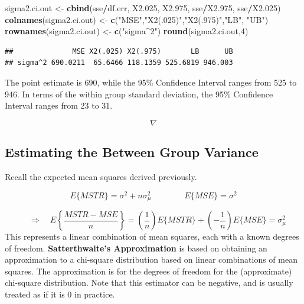 \documentclass[
]{book}
\newenvironment{Shaded}{\begin{snugshade}}{\end{snugshade}}
\newcommand{\DecValTok}[1]{\textcolor[rgb]{0.00,0.00,0.81}{#1}}
\newcommand{\FloatTok}[1]{\textcolor[rgb]{0.00,0.00,0.81}{#1}}
\newcommand{\FunctionTok}[1]{\textcolor[rgb]{0.13,0.29,0.53}{\textbf{#1}}}
\newcommand{\NormalTok}[1]{#1}
\newcommand{\OtherTok}[1]{\textcolor[rgb]{0.56,0.35,0.01}{#1}}
\newcommand{\SpecialCharTok}[1]{\textcolor[rgb]{0.81,0.36,0.00}{\textbf{#1}}}
\newcommand{\StringTok}[1]{\textcolor[rgb]{0.31,0.60,0.02}{#1}}
\begin{document}
\begin{Shaded}
\begin{Highlighting}[]
\NormalTok{sigma2.ci.out }\OtherTok{\textless{}{-}} \FunctionTok{cbind}\NormalTok{(sse}\SpecialCharTok{/}\NormalTok{df.err, X2}\FloatTok{.025}\NormalTok{, X2}\FloatTok{.975}\NormalTok{,  sse}\SpecialCharTok{/}\NormalTok{X2}\FloatTok{.975}\NormalTok{, sse}\SpecialCharTok{/}\NormalTok{X2}\FloatTok{.025}\NormalTok{)}
\FunctionTok{colnames}\NormalTok{(sigma2.ci.out) }\OtherTok{\textless{}{-}} \FunctionTok{c}\NormalTok{(}\StringTok{"MSE"}\NormalTok{,}\StringTok{"X2(.025)"}\NormalTok{,}\StringTok{"X2(.975)"}\NormalTok{,}\StringTok{"LB"}\NormalTok{, }\StringTok{"UB"}\NormalTok{)}
\FunctionTok{rownames}\NormalTok{(sigma2.ci.out) }\OtherTok{\textless{}{-}} \FunctionTok{c}\NormalTok{(}\StringTok{"sigma\^{}2"}\NormalTok{)}
\FunctionTok{round}\NormalTok{(sigma2.ci.out,}\DecValTok{4}\NormalTok{)}
\end{Highlighting}
\end{Shaded}

\begin{verbatim}
##              MSE X2(.025) X2(.975)       LB      UB
## sigma^2 690.0211  65.6466 118.1359 525.6819 946.003
\end{verbatim}

The point estimate is 690, while the 95\% Confidence Interval ranges
from 525 to 946. In terms of the within group standard deviation, the
95\% Confidence Interval ranges from 23 to 31.

\[\nabla \]

\subsection{Estimating the Between Group
Variance}\label{estimating-the-between-group-variance}

Recall the expected mean squares derived previously.

\[
E\{MSTR\}=\sigma^2 + n\sigma_{\mu}^2 \qquad \qquad E\{MSE\}=\sigma^2
\]

\[
\quad \Rightarrow \quad E\left\{\frac{MSTR-MSE}{n}\right\} = 
\left(\frac{1}{n}\right)E\{MSTR\} +\left(-\frac{1}{n}\right)E\{MSE\}
=\sigma_{\mu}^2
\] This represents a linear combination of mean squares, each with a
known degrees of freedom. \textbf{Satterthwaite's Approximation} is
based on obtaining an approximation to a chi-square distribution based
on linear combinations of mean squares. The approximation is for the
degrees of freedom for the (approximate) chi-square distribution. Note
that this estimator can be negative, and is usually treated as if it is
0 in practice.
\end{document}
